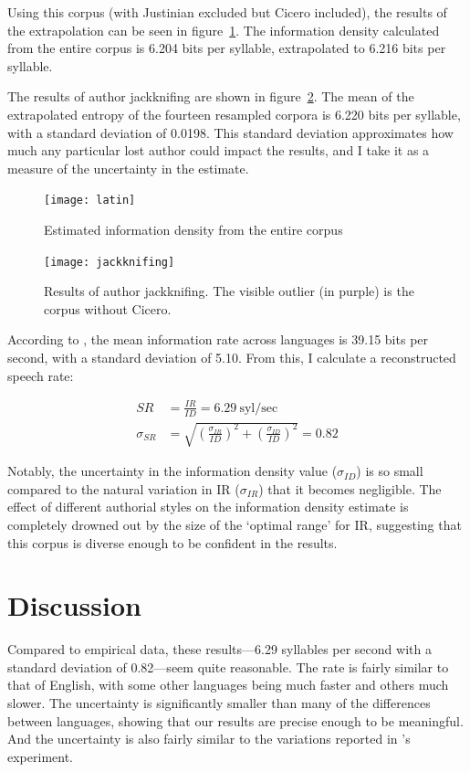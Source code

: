 \documentclass[12pt,twoside,leqno]{article} %
\begin{document}
Using this corpus (with Justinian excluded but Cicero included), the results of the extrapolation can be seen in figure~\ref{fig:results}. The information density calculated from the entire corpus is 6.204 bits per syllable, extrapolated to 6.216 bits per syllable.

The results of author jackknifing are shown in figure~\ref{fig:jackknifing}. The mean of the extrapolated entropy of the fourteen resampled corpora is 6.220 bits per syllable, with a standard deviation of 0.0198. This standard deviation approximates how much any particular lost author could impact the results, and I take it as a measure of the uncertainty in the estimate.

\begin{figure}[p]
\centering
\caption{Estimated information density from the entire corpus}
\label{fig:results}
\noindent\texttt{[image: latin]}
\end{figure}

\begin{figure}[p]
\centering
\caption{Results of author jackknifing. The visible outlier (in purple) is the corpus without Cicero.}
\label{fig:jackknifing}
\noindent\texttt{[image: jackknifing]}
\end{figure}

According to \citet{coupé}, the mean information rate across languages is 39.15 bits per second, with a standard deviation of 5.10. From this, I calculate a reconstructed speech rate:

\begin{align}
SR &= \frac{IR}{ID} = 6.29\:\textrm{syl/sec} \\
\sigma_{SR} &= \sqrt{\left(\frac{\sigma_{IR}}{ID}\right)^2 + \left(\frac{\sigma_{ID}}{ID}\right)^2} = 0.82
\end{align}

Notably, the uncertainty in the information density value (\(\sigma_{ID}\)) is so small compared to the natural variation in IR (\(\sigma_{IR}\)) that it becomes negligible. The effect of different authorial styles on the information density estimate is completely drowned out by the size of the `optimal range' for IR, suggesting that this corpus is diverse enough to be confident in the results.

\section{Discussion}
\label{sec:disc}

Compared to  empirical data, these results---6.29 syllables per second with a standard deviation of 0.82---seem quite reasonable. The rate is fairly similar to that of English, with some other languages being much faster and others much slower. The uncertainty is significantly smaller than many of the differences between languages, showing that our results are precise enough to be meaningful. And the uncertainty is also fairly similar to the variations reported in \citeauthor{coupé}'s experiment.
\end{document}

